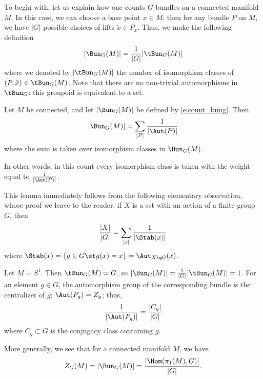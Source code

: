 To begin with, let us explain how one counts $G$-bundles on a connected
manifold $M$. In this case, we can choose a base point $x\in M$; then for any
bundle $P$ on $M$, we have $|G|$ possible choices of lifts $\tilde x\in P_x$.
Thus, we make the following definition
\begin{equation}\label{e:count_bung}
  |\Bun_G(M)|=\frac{1}{|G|} |\tBun_G(M)|
\end{equation}
where we denoted by $|\tBun_G(M)|$ the number of isomorphism classes of
$(P,\tilde x)\in \tBun_G(M)$. Note that there are no non-trivial
automorphisms in $\tBun_G$: this groupoid is equivalent to a set.

\begin{lemma}\label{l:count_aut}
  Let $M$ be connected, and let $|\Bun_G(M)|$ be defined by
  \eqref{e:count_bung}. Then
  $$
    |\Bun_G(M)|=\sum_{[P]} \frac{1}{|\Aut(P)|}
  $$
  where the sum is taken over isomorphism classes in $\Bun_G(M)$.
\end{lemma}
In other words, in this count every isomorphism class is taken with
the weight equal to $\frac{1}{|\Aut(P)|}$.

This lemma immediately follows from the following elementary observation,
whose proof we leave to the reader: if $X$ is a set with an action of a
finite group $G$, then
$$
  \frac{|X|}{|G|}=\sum_{[x]}\frac{1}{|\Stab(x)|}
$$
where $\Stab(x)=\{g\in G\st g(x)=x\}=\Aut_{X\q G}(x)$.
\begin{example}\label{x:bun-circle}
  Let $M=S^1$. Then $\tBun_G(M)\simeq G$, so $|\Bun_G(M)|=\frac{1}{|G|}
  |\tBun_G(M)|=1$.
  For an element $g\in G$, the automorphism group of the corresponding bundle
  is the centralizer of $g$: $\Aut(P_g)=Z_g$; thus,
  $$
  \frac{1}{|\Aut(P_g)|}= \frac{|C_g|}{|G|}
  $$
  where $C_g\subset G$ is the conjugacy class containing $g$.
\end{example}

More generally, we see that for a connected manifold $M$, we have
\begin{equation}\label{e:dw_closed}
  Z_G(M)= |\Bun_G(M)|= \frac{|\Hom(\pi_1(M), G)|}{|G|}.
\end{equation}


